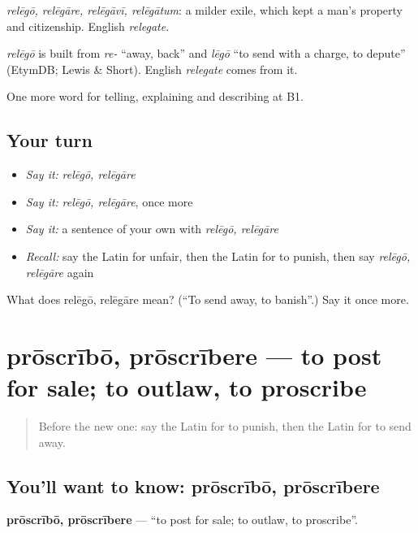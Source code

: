 \emph{relēgō, relēgāre, relēgāvī, relēgātum}: a milder exile, which kept a man's property and citizenship. English \emph{relegate}.

\begin{cousinweb}
\emph{relēgō} is built from \emph{re-} \textquotedblleft{}away, back\textquotedblright{} and \emph{lēgō} \textquotedblleft{}to send with a charge, to depute\textquotedblright{} (EtymDB; Lewis \& Short). English \emph{relegate} comes from it.
\end{cousinweb}

\begin{grammarlens}[title={What you've built}]
One more word for telling, explaining and describing at B1.
\end{grammarlens}

\subsection*{Your turn}
\begin{itemize}
\raggedright
  \item \emph{Say it:} \emph{relēgō, relēgāre}
  \item \emph{Say it:} \emph{relēgō, relēgāre}, once more
  \item \emph{Say it:} a sentence of your own with \emph{relēgō, relēgāre}
  \item \emph{Recall:} say the Latin for unfair, then the Latin for to punish, then say \emph{relēgō, relēgāre} again
\end{itemize}

\begin{tcolorbox}[breakable,colback=teal!4,colframe=teal!35!black,title={Before you move on}]
What does relēgō, relēgāre mean? (\textquotedblleft{}To send away, to banish\textquotedblright{}.) Say it once more.
\end{tcolorbox}
\section[prōscrībō, prōscrībere]{prōscrībō, prōscrībere — to post for sale; to outlaw, to proscribe}

\label{lesson:LA-C415-proscribo}



\begin{quote}
Before the new one: say the Latin for to punish, then the Latin for to send away.
\end{quote}

\subsection*{You'll want to know: prōscrībō, prōscrībere}
\textbf{prōscrībō, prōscrībere} — \textquotedblleft{}to post for sale; to outlaw, to proscribe\textquotedblright{}.

